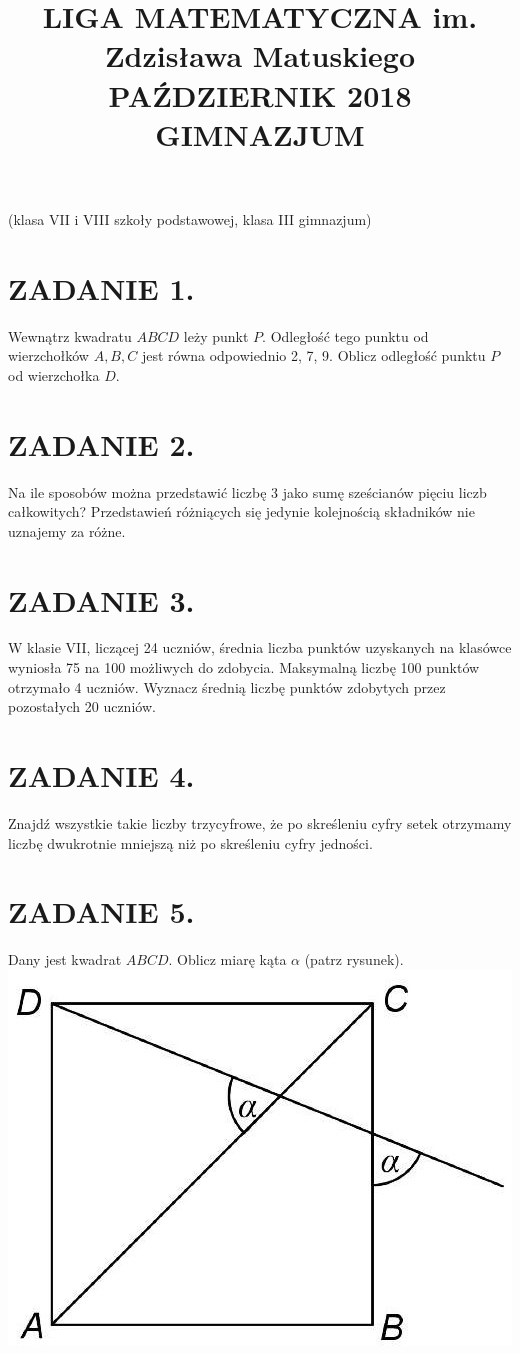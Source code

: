 \documentclass[10pt]{article}
\title{LIGA MATEMATYCZNA im. Zdzisława Matuskiego \\
 PAŹDZIERNIK 2018 \\
 GIMNAZJUM }
\author{}
\date{}
\begin{document}
\maketitle
(klasa VII i VIII szkoły podstawowej, klasa III gimnazjum)

\section*{ZADANIE 1.}
Wewnątrz kwadratu \(A B C D\) leży punkt \(P\). Odległość tego punktu od wierzchołków \(A, B, C\) jest równa odpowiednio 2, 7, 9. Oblicz odległość punktu \(P\) od wierzchołka \(D\).

\section*{ZADANIE 2.}
Na ile sposobów można przedstawić liczbę 3 jako sumę sześcianów pięciu liczb całkowitych? Przedstawień różniących się jedynie kolejnością składników nie uznajemy za różne.

\section*{ZADANIE 3.}
W klasie VII, liczącej 24 uczniów, średnia liczba punktów uzyskanych na klasówce wyniosła 75 na 100 możliwych do zdobycia. Maksymalną liczbę 100 punktów otrzymało 4 uczniów. Wyznacz średnią liczbę punktów zdobytych przez pozostałych 20 uczniów.

\section*{ZADANIE 4.}
Znajdź wszystkie takie liczby trzycyfrowe, że po skreśleniu cyfry setek otrzymamy liczbę dwukrotnie mniejszą niż po skreśleniu cyfry jedności.

\section*{ZADANIE 5.}
Dany jest kwadrat \(A B C D\). Oblicz miarę kąta \(\alpha\) (patrz rysunek).\\
\includegraphics[max width=\textwidth, center]{2024_11_21_d79c811e6abe9c0f3ebfg-1}
\end{document}
